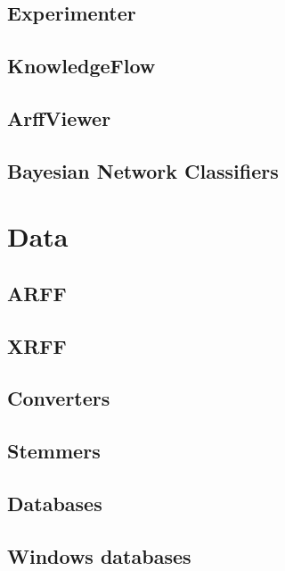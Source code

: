 \documentclass[a4paper]{book}
\begin{document}
\chapter{Experimenter}


\chapter{KnowledgeFlow}


\chapter{ArffViewer}


\chapter{Bayesian Network Classifiers}


\part{Data}

\chapter{ARFF}


\chapter{XRFF}
\label{xrff}


\chapter{Converters}


\chapter{Stemmers}


\chapter{Databases}


\chapter{Windows databases}

\end{document}
